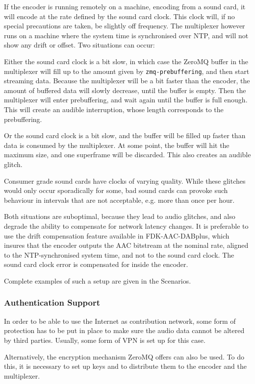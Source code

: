 If the encoder is running remotely on a machine, encoding from a sound card, it will encode at the
rate defined by the sound card clock. This clock will, if no special precautions are taken, be
slightly off frequency. The multiplexer however runs on a machine where the system time is
synchronised over NTP, and will not show any drift or offset. Two situations can occur:

Either the sound card clock is a bit slow, in which case the ZeroMQ buffer in the multiplexer will
fill up to the amount given by \texttt{zmq-prebuffering}, and then start streaming data. Because the
multiplexer will be a bit faster than the encoder, the amount of buffered data will slowly decrease,
until the buffer is empty. Then the multiplexer will enter prebuffering, and wait again until the
buffer is full enough. This will create an audible interruption, whose length corresponds to the
prebuffering.

Or the sound card clock is a bit slow, and the buffer will be filled up faster than data is consumed
by the multiplexer. At some point, the buffer will hit the maximum size, and one superframe will be
discarded. This also creates an audible glitch.

Consumer grade sound cards have clocks of varying quality. While these glitches would only occur
sporadically for some, bad sound cards can provoke such behaviour in intervals that are not
acceptable, e.g. more than once per hour.

Both situations are suboptimal, because they lead to audio glitches, and also degrade the ability to
compensate for network latency changes. It is preferable to use the drift compensation feature
available in FDK-AAC-DABplus, which insures that the encoder outputs the AAC bitstream at the
nominal rate, aligned to the NTP-synchronised system time, and not to the sound card clock. The
sound card clock error is compensated for inside the encoder.

Complete examples of such a setup are given in the Scenarios.

\subsubsection{Authentication Support}
In order to be able to use the Internet as contribution network, some form of protection has to be
put in place to make sure the audio data cannot be altered by third parties. Usually, some form of
VPN is set up for this case.

Alternatively, the encryption mechanism ZeroMQ offers can also be used. To do this, it is necessary
to set up keys and to distribute them to the encoder and the multiplexer.

